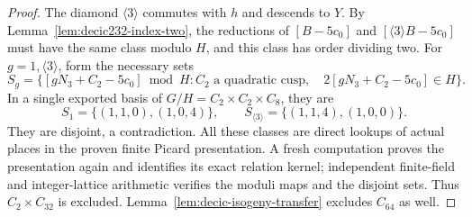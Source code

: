\begin{proof}
The diamond $\langle3\rangle$ commutes with $h$ and descends to $Y$.
By Lemma~\ref{lem:decic232-index-two}, the reductions of
$[B-5c_0]$ and $[\langle3\rangle B-5c_0]$ must have the same
class modulo $H$, and this class has order dividing two.
For $g=1,\langle3\rangle$, form the necessary sets
\[
 S_g=\{[gN_3+C_2-5c_0]\bmod H:
 C_2\text{ a quadratic cusp},\quad
 2[gN_3+C_2-5c_0]\in H\}.
\]
In a single exported basis of $G/H=C_2\times C_2\times C_8$, they are
\[
 S_1=\{(1,1,0),(1,0,4)\},\qquad
 S_{\langle3\rangle}=\{(1,1,4),(1,0,0)\}.
\]
They are disjoint, a contradiction.
All these classes are direct lookups of actual places in the
proven finite Picard presentation. A fresh computation proves
the presentation again and identifies its exact relation kernel;
independent finite-field and integer-lattice arithmetic verifies
the moduli maps and the disjoint sets.
Thus $C_2\times C_{32}$ is excluded.
Lemma~\ref{lem:decic-isogeny-transfer} excludes $C_{64}$ as well.
\end{proof}
